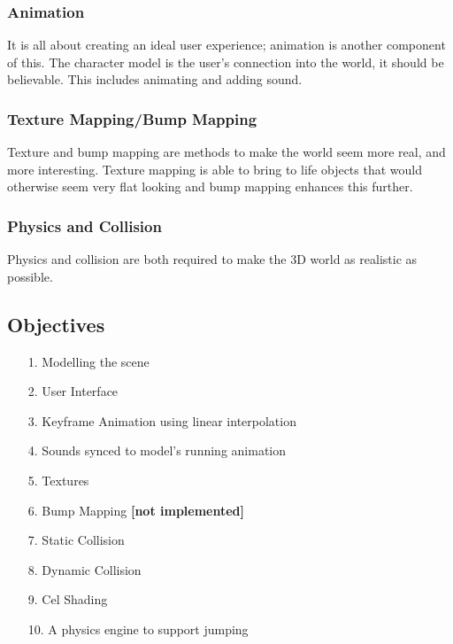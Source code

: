 \documentclass {article}
\begin{document}
    \subsubsection{Animation}
    It is all about creating an ideal user experience; animation is another component of this. The character model is the user's connection into the world, it should be believable. This includes animating and adding sound.

    \subsubsection{Texture Mapping/Bump Mapping}
    Texture and bump mapping are methods to make the world seem more real, and more interesting. Texture mapping is able to bring to life objects that would otherwise seem very flat looking and bump mapping enhances this further.

    \subsubsection{Physics and Collision}
    Physics and collision are both required to make the 3D world as realistic as possible.

\subsection{Objectives}

\begin{enumerate}
     \item[1.]  Modelling the scene

     \item[2.]  User Interface

     \item[3.]  Keyframe Animation using linear interpolation

     \item[4.]  Sounds synced to model's running animation

     \item[5.]  Textures

     \item[6.]  Bump Mapping \textbf{[not implemented]}

     \item[7.]  Static Collision

     \item[8.]  Dynamic Collision

     \item[9.]  Cel Shading

     \item[10.]  A physics engine to support jumping

\end{enumerate}
\end{document}
